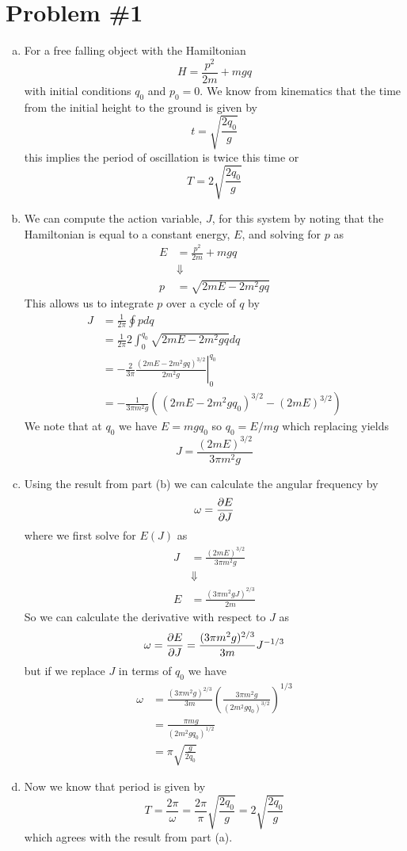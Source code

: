 \documentclass[11pt]{article}
\numberwithin{equation}{section}
\begin{document}


\section{Problem \#1}
\begin{enumerate}[(a)]
\item For a free falling object with the Hamiltonian
$$H = \frac{p^2}{2m} + mgq$$
with initial conditions $q_0$ and $p_0=0$. We know from kinematics that the time from the
initial height to the ground is given by
$$t = \sqrt{\frac{2q_0}{g}}$$
this implies the period of oscillation is twice this time or
$$T =  2\sqrt{\frac{2q_0}{g}}$$

\item We can compute the action variable, $J$, for this system by noting that the 
Hamiltonian is equal to a constant energy, $E$, and solving for $p$ as
\begin{align*}
E &= \frac{p^2}{2m} + mgq\\
&\Downarrow\\
p &= \sqrt{2mE - 2m^2gq}
\end{align*}
This allows us to integrate $p$ over a cycle of $q$ by
\begin{align*}
J &= \frac{1}{2\pi}\oint{pdq}\\
&= \frac{1}{2\pi}2\int_{0}^{q_0}\sqrt{2mE - 2m^2gq}dq\\
&= -\frac{2}{3\pi}\left.\frac{(2mE - 2m^2gq)^{3/2}}{2m^2g}\right|_0^{q_0}\\
&= -\frac{1}{3\pi{m^2g}}\left(\frac{}{}(2mE - 2m^2gq_0)^{3/2} - (2mE)^{3/2}\right)
\end{align*}
We note that at $q_0$ we have $E = mgq_0$ so $q_0=E/mg$ which replacing yields
$$J = \frac{(2mE)^{3/2}}{3\pi{m^2g}}$$

\item Using the result from part (b) we can calculate the angular frequency by
$$\omega = \frac{\partial{E}}{\partial{J}}$$
where we first solve for $E(J)$ as
\begin{align*}
J &= \frac{(2mE)^{3/2}}{3\pi{m^2g}}\\
&\Downarrow\\
E &= \frac{(3\pi{m^2g}J)^{2/3}}{2m}
\end{align*}
So we can calculate the derivative with respect to $J$ as
$$\omega = \frac{\partial{E}}{\partial{J}} = \frac{(3\pi{m^2g})^{2/3}}{3m}J^{-1/3}$$
but if we replace $J$ in terms of $q_0$ we have
\begin{align*}
\omega &= \frac{(3\pi{m^2g})^{2/3}}{3m}\left(\frac{3\pi{m^2g}}{(2m^2gq_0)^{3/2}}\right)^{1/3}\\
&= \frac{\pi{mg}}{(2m^2gq_0)^{1/2}}\\
&= \pi\sqrt{\frac{g}{2q_0}}
\end{align*}

\item Now we know that period is given by
$$T = \frac{2\pi}{\omega} = \frac{2\pi}{\pi}\sqrt{\frac{2q_0}{g}} = 2\sqrt{\frac{2q_0}{g}}$$
which agrees with the result from part (a).

\end{enumerate}
\end{document}
